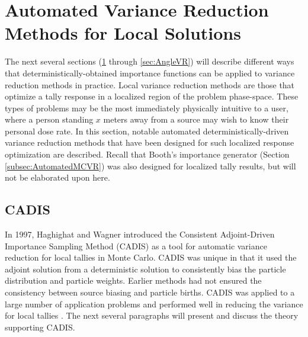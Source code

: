 \section{Automated Variance Reduction Methods for Local Solutions}
\label{sec:localVR}

The next several sections (\ref{sec:localVR} through \ref{sec:AngleVR})
will describe different ways that deterministically-obtained importance
functions
can be applied to variance reduction methods in practice. Local variance
reduction methods are those that optimize a tally response in a localized region
of the problem phase-space. These types of problems may be the most immediately
physically intuitive to a user,
where a person standing $x$ meters away from a source may wish to know their
personal dose rate. In this section, notable
automated deterministically-driven variance reduction methods that
have been designed for such localized response optimization are described.
Recall that Booth's importance generator (Section \ref{subsec:AutomatedMCVR})
was also designed for localized tally results, but will not be elaborated upon
here.

\subsection{CADIS}
\label{sec:CADIS}

In 1997, Haghighat and Wagner introduced the Consistent Adjoint-Driven
Importance Sampling Method (CADIS)
\cite{wagner_automatic_1997,wagner_automated_1998,haghighat_monte_2003} as a
tool for automatic variance reduction for local tallies in Monte Carlo. CADIS
was unique in that it used the adjoint solution from a deterministic solution to
consistently bias the particle distribution and particle weights. Earlier
methods had not ensured the consistency between source biasing and particle
births. CADIS was applied to a large number of application problems and
performed well in reducing the variance for local tallies
\cite{wagner_review_2011}. The next several paragraphs will present and discuss
the theory supporting CADIS.

